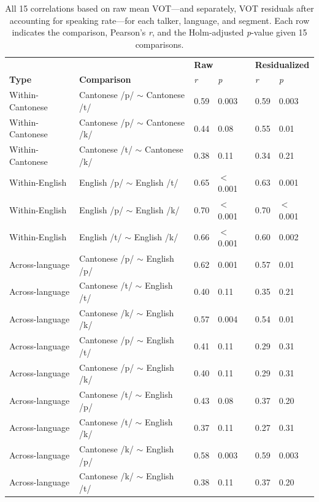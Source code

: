 \begin{table}[htbp]
  \caption{All 15 correlations based on raw mean VOT---and separately, VOT residuals after accounting for speaking rate---for each talker, language, and segment. Each row indicates the comparison, Pearson's \textit{r}, and the Holm-adjusted \textit{p}-value given 15 comparisons.}
    \label{ch4:tab:correlations}
    \centering 
    \footnotesize
    \begin{tabular}{ll|ll|ll}
      \toprule
      &   & \multicolumn{2}{l|}{\textbf{Raw}} & \multicolumn{2}{l}{\textbf{Residualized}} \\
      \textbf{Type}     & \textbf{Comparison} & \textit{r}        & \textit{p}       & \textit{r}            & \textit{p}            \\
    \midrule
    Within-Cantonese  & Cantonese /p/ $\sim$ Cantonese /t/    & 0.59    & 0.003       & 0.59   & 0.003    \\
    Within-Cantonese  & Cantonese /p/ $\sim$ Cantonese /k/    & 0.44    & 0.08        & 0.55   & 0.01     \\
    Within-Cantonese  & Cantonese /t/ $\sim$ Cantonese /k/    & 0.38    & 0.11        & 0.34   & 0.21     \\
    \midrule
    Within-English    & English /p/   $\sim$  English /t/     & 0.65    & $<$0.001    & 0.63   & 0.001    \\
    Within-English    & English /p/   $\sim$  English /k/     & 0.70    & $<$0.001    & 0.70   & $<$0.001 \\
    Within-English    & English /t/   $\sim$  English /k/     & 0.66    & $<$0.001    & 0.60   & 0.002    \\
    \midrule
    Across-language   & Cantonese /p/  $\sim$ English /p/     & 0.62    & 0.001       & 0.57   & 0.01    \\
    Across-language   & Cantonese /t/  $\sim$ English /t/     & 0.40    & 0.11        & 0.35   & 0.21    \\
    Across-language   & Cantonese /k/  $\sim$ English /k/     & 0.57    & 0.004       & 0.54   & 0.01    \\
    \midrule
    Across-language   & Cantonese /p/  $\sim$ English /t/     & 0.41    & 0.11        & 0.29   & 0.31    \\
    Across-language   & Cantonese /p/  $\sim$ English /k/     & 0.40    & 0.11        & 0.29   & 0.31    \\
    Across-language   & Cantonese /t/  $\sim$ English /p/     & 0.43    & 0.08        & 0.37   & 0.20    \\
    Across-language   & Cantonese /t/  $\sim$ English /k/     & 0.37    & 0.11        & 0.27   & 0.31    \\
    Across-language   & Cantonese /k/  $\sim$ English /p/     & 0.58    & 0.003       & 0.59   & 0.003   \\
    Across-language   & Cantonese /k/  $\sim$ English /t/     & 0.38    & 0.11        & 0.37   & 0.20    \\
    \bottomrule
    \end{tabular}
\end{table}

